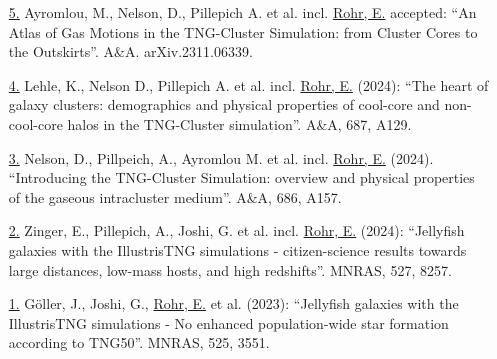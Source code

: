 \documentclass[a4paper,10pt,oneside]{article}
\begin{document}
\begin{enumerate}[wide, labelwidth=!, labelindent=-11pt, parsep=0pt]
    \item[\href{https://ui.adsabs.harvard.edu/abs/2023arXiv231106339A/abstract}{5.}] Ayromlou, M., Nelson, D., Pillepich A. et al. incl. \underline{Rohr, E.} accepted: ``An Atlas of Gas Motions in the TNG-Cluster Simulation: from Cluster Cores to the Outskirts''. A\&A. arXiv.2311.06339.
    \item[\href{https://ui.adsabs.harvard.edu/abs/2024A\%26A...687A.129L/abstract}{4.}] Lehle, K., Nelson D., Pillepich A. et al. incl. \underline{Rohr, E.} (2024): ``The heart of galaxy clusters: demographics and physical properties of cool-core and non-cool-core halos in the TNG-Cluster simulation''. A\&A, 687, A129.
    \item[\href{https://ui.adsabs.harvard.edu/abs/2024A&A...686A.157N/abstract}{3.}] Nelson, D., Pillpeich, A., Ayromlou M. et al. incl. \underline{Rohr, E.} (2024). ``Introducing the TNG-Cluster Simulation: overview and physical properties of the gaseous intracluster medium''. A\&A, 686, A157.
    \item[\href{https://ui.adsabs.harvard.edu/abs/2024MNRAS.527.8257Z/abstract}{2.}] Zinger, E., Pillepich, A., Joshi, G. et al. incl. \underline{Rohr, E.} (2024): ``Jellyfish galaxies with the IllustrisTNG simulations - citizen-science results towards large distances, low-mass hosts, and high redshifts''. MNRAS, 527, 8257.
    \item[\href{https://ui.adsabs.harvard.edu/abs/2023MNRAS.525.3551G/abstract}{1.}] G{\"o}ller, J., Joshi, G., \underline{Rohr, E.} et al. (2023): ``Jellyfish galaxies with the IllustrisTNG simulations - No enhanced population-wide star formation according to TNG50''. MNRAS, 525, 3551.
\end{enumerate}

\noindent{}
\end{document}
